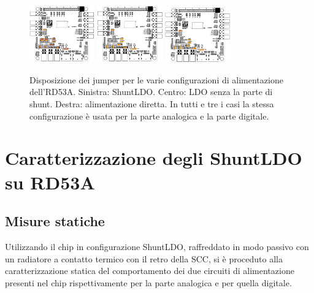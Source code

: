 \begin{figure}[h]
\centering
\includegraphics[width=0.25\textwidth]{Immagini/SLDOmode}
\hfill
\includegraphics[width=0.25\textwidth]{Immagini/LDOmodeDefault}
\hfill
\includegraphics[width=0.25\textwidth]{Immagini/DirectPowering}
\caption{Disposizione dei jumper per le varie configurazioni di alimentazione dell'RD53A. Sinistra: ShuntLDO. Centro: LDO senza la parte di shunt. Destra: alimentazione diretta. In tutti e tre i casi la stessa configurazione \`e usata per la parte analogica e la parte digitale.}
\label{SLDOmodes}
\end{figure}

\section{Caratterizzazione degli ShuntLDO su RD53A}
\label{45}

\subsection{Misure statiche}

Utilizzando il chip in configurazione ShuntLDO, raffreddato in modo passivo con un radiatore a contatto termico con il retro della SCC, si è proceduto alla caratterizzazione statica del comportamento dei due circuiti di alimentazione presenti nel chip rispettivamente per la parte analogica e per quella digitale.

